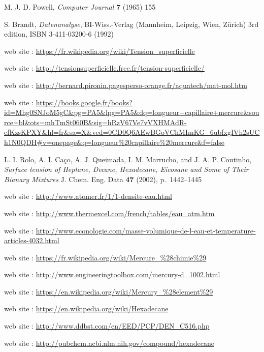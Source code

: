 \documentclass[fleqn]{scrartcl}
\begin{document}
 M. J. D. Powell, \textit{Computer Journal}
  \textbf{7} (1965) 155

 S. Brandt, \textit{Datenanalyse}, BI-Wiss.-Verlag
  (Mannheim, Leipzig, Wien, Zürich) 3rd edition, ISBN 3-411-03200-6
  (1992)

 web site : \url{https://fr.wikipedia.org/wiki/Tension_superficielle}

 web site : \url{http://tensionsuperficielle.free.fr/tension-superficielle/}

 web site : \url{http://bernard.pironin.pagesperso-orange.fr/aquatech/mat-mol.htm}

 web site : \url{https://books.google.fr/books?id=Mhg0SNJoM5gC&pg=PA5&lpg=PA5&dq=longueur+capillaire+mercure&source=bl&ots=mhTmSt060B&sig=hRzV67Ve7vVXHMAdR-efKzsKPXY&hl=fr&sa=X&ved=0CD0Q6AEwBGoVChMImKG_6ubfxgIVh2sUCh1N0QDH#v=onepage&q=longueur%20capillaire%20mercure&f=false}

 L. I. Rolo, A. I. Caço, A. J. Queimada, I. M. Marrucho, and J. A. P. Coutinho, \textit{Surface tension of Heptane, Decane, Hexadecane, Eicosane and Some of Their Bianary Mixtures} J. Chem. Eng. Data \textbf{47} (2002), p.~1442--1445

 web site : \url{http://www.atomer.fr/1/1-densite-eau.html}

 web site : \url{http://www.thermexcel.com/french/tables/eau_atm.htm}

 web site : \url{http://www.econologie.com/masse-volumique-de-l-eau-et-temperature-articles-4032.html}

 web site : \url{https://fr.wikipedia.org/wiki/Mercure_%28chimie%29}

 web site : \url{http://www.engineeringtoolbox.com/mercury-d_1002.html}

 web site : \url{https://en.wikipedia.org/wiki/Mercury_%28element%29}

 web site : \url{https://en.wikipedia.org/wiki/Hexadecane}

 web site : \url{http://www.ddbst.com/en/EED/PCP/DEN_C516.php}

 web site : \url{http://pubchem.ncbi.nlm.nih.gov/compound/hexadecane}
\end{document}
